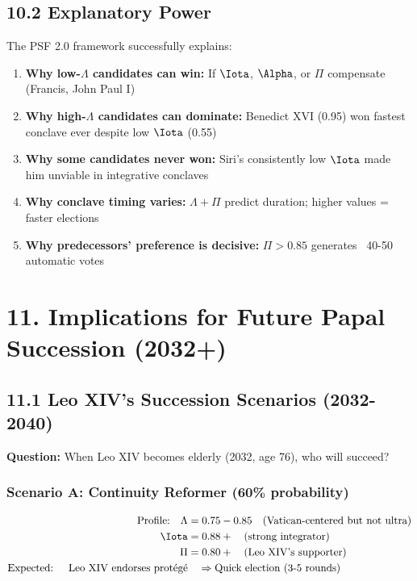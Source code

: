\subsection{10.2 Explanatory Power}

The PSF 2.0 framework successfully explains:

\begin{enumerate}
\item \textbf{Why low-$\Lambda$ candidates can win:} If $\Iota$, $\Alpha$, or $\Pi$ compensate (Francis, John Paul I)

\item \textbf{Why high-$\Lambda$ candidates can dominate:} Benedict XVI (0.95) won fastest conclave ever despite low $\Iota$ (0.55)

\item \textbf{Why some candidates never won:} Siri's consistently low $\Iota$ made him unviable in integrative conclaves

\item \textbf{Why conclave timing varies:} $\Lambda + \Pi$ predict duration; higher values = faster elections

\item \textbf{Why predecessors' preference is decisive:} $\Pi > 0.85$ generates ~40-50 automatic votes

\end{enumerate}

\section{11. Implications for Future Papal Succession (2032+)}

\subsection{11.1 Leo XIV's Succession Scenarios (2032-2040)}

\textbf{Question:} When Leo XIV becomes elderly (2032, age 76), who will succeed?

\subsubsection{Scenario A: Continuity Reformer (60\% probability)}
\begin{align*}
\text{Profile:} \quad \Lambda &= 0.75-0.85 \quad \text{(Vatican-centered but not ultra)} \\
\Iota &= 0.88+ \quad \text{(strong integrator)} \\
\Pi &= 0.80+ \quad \text{(Leo XIV's supporter)} \\
\text{Expected: } \quad \text{Leo XIV endorses protégé} &\quad \Rightarrow \text{Quick election (3-5 rounds)}
\end{align*}


